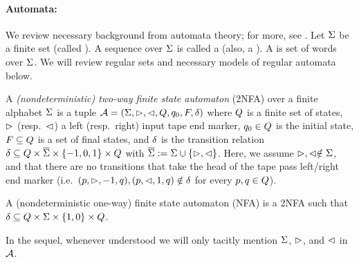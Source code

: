 \paragraph{Automata: } We review necessary background from automata theory;
for more, see \cite{Kozen-automata}. Let $\Sigma$ be a finite set (called
). A sequence over $\Sigma$ is called a 
(also, a ). A  is set of words over $\Sigma$.
We will review regular sets and necessary models of regular automata below.

\begin{definition} \label{def:2nfa}
    A \emph{(nondeterministic) two-way finite state automaton}
(2NFA) over a finite alphabet $\Sigma$ is a tuple $\mathcal{A} =
(\Sigma, \vartriangleright, \vartriangleleft, Q, q_0, F, \delta)$ where 
    $Q$ is a finite set of 
    states, $\vartriangleright$ (resp.~$\vartriangleleft$) a left (resp.~right) input tape end 
    marker, $q_0\in Q$ is
the initial state, $F\subseteq Q$ is a set of final states, and 
    $\delta$ is the
transition relation  $\delta\subseteq Q \times 
    \overline{\Sigma}\times \{-1, 0, 1\}\times Q$ with
    $\overline{\Sigma} := \Sigma \cup \{\vartriangleright,\vartriangleleft\}$.
    Here, we assume $\vartriangleright, \vartriangleleft \notin \Sigma$, and that
    there are no transitions that take the head of the tape pass left/right
    end marker (i.e.~$(p,\vartriangleright,-1,q), (p,\vartriangleleft,1,q) \notin
    \delta$ for every $p, q \in Q$).

    A (nondeterministic one-way) finite state automaton (NFA)
is a 2NFA such that $\delta\subseteq Q \times \Sigma\times
    \{1,0\} \times Q $.
\end{definition}
In the sequel, whenever understood we will only tacitly mention $\Sigma$, 
$\vartriangleright$, and $\vartriangleleft$ in $\mathcal{A}$. 


